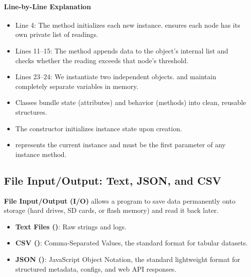 \paragraph{Line-by-Line Explanation}
\begin{itemize}
    \item Line 4: The  method initializes each new instance.  ensures each node has its own private list of readings.
    \item Lines 11--15: The  method appends data to the object's internal list and checks whether the reading exceeds that node's threshold.
    \item Lines 23--24: We instantiate two independent objects.  and  maintain completely separate variables in memory.
\end{itemize}

\begin{takeaways}
\begin{itemize}
    \item Classes bundle state (attributes) and behavior (methods) into clean, reusable structures.
    \item The constructor  initializes instance state upon creation.
    \item {} represents the current instance and must be the first parameter of any instance method.
\end{itemize}
\end{takeaways}

\subsection{File Input/Output: Text, JSON, and CSV}

\begin{keyidea}
\textbf{File Input/Output (I/O)} allows a program to save data permanently onto storage (hard drives, SD cards, or flash memory) and read it back later.
\begin{itemize}
    \item \textbf{Text Files ()}: Raw strings and logs.
    \item \textbf{CSV ()}: Comma-Separated Values, the standard format for tabular datasets.
    \item \textbf{JSON ()}: JavaScript Object Notation, the standard lightweight format for structured metadata, configs, and web API responses.
\end{itemize}
\end{keyidea}


